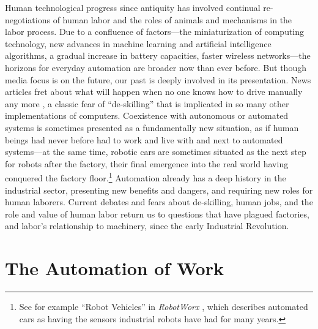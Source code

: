 Human technological progress since antiquity has
involved continual re-negotiations of human labor and the roles of
animals and mechanisms in the labor process. Due to a confluence
of factors---the miniaturization of computing technology, new
advances in machine learning and artificial intelligence algorithms, a
gradual increase in battery capacities, faster wireless networks---the
horizons for everyday automation are broader now than ever before. But
though media focus is on the future, our past is deeply involved 
in its presentation. News articles fret
about what will happen when no one knows how to drive manually any
more \cite{pross}, a classic fear of ``de-skilling'' that is implicated in so many
other implementations of computers. Coexistence with
autonomous or automated systems is sometimes presented as a fundamentally new
situation, as if human beings had never before had to work and live
with and next to automated systems---at the same time, robotic cars
are sometimes situated as 
the next step for robots after the factory, their final emergence into
the real world having conquered the factory floor.\footnote{See for
  example ``Robot Vehicles'' in \emph{RobotWorx} \cite{robotworx}, which describes automated cars as having the sensors
  industrial robots have had for many years.} 
Automation already has a deep 
history in the industrial sector, presenting new benefits and
dangers, and requiring new roles for human laborers. Current debates
and fears about de-skilling, human jobs, 
and the role and value of human labor return us to questions that have
plagued factories, and labor's relationship to machinery, since the
early Industrial Revolution. 


\section{The Automation of Work}


